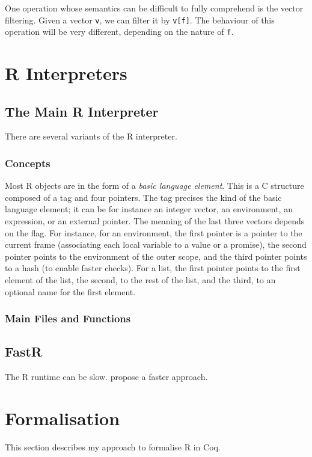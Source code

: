 \documentclass{article}
\newcommand\Coq{Coq}
\newcommand\R{R}
\begin{document}
One operation whose semantics can be difficult
to fully comprehend is the vector filtering.
Given a vector \texttt{v},
we can filter it by \texttt{v[f]}.
The behaviour of this operation will be very different,
depending on the nature of \texttt{f}.


\section{\R{} Interpreters}

\subsection{The Main \R{} Interpreter}

There are several variants of the \R{} interpreter.

\subsubsection{Concepts}

Most \R{} objects are in the form of a \emph{basic language element}.
This is a C structure composed of a tag and four pointers.
The tag precises the kind of the basic language element;
it can be for instance an integer vector, an environment, an expression, or an external pointer.
The meaning of the last three vectors depends on the flag.
%
For instance, for an environment, the first pointer is a pointer
to the current frame (associating each local variable to a value or a promise),
the second pointer points to the environment of the outer scope,
and the third pointer points to a hash (to enable faster checks).
%
For a list, the first pointer points to the first element of the list,
the second, to the rest of the list,
and the third, to an optional name for the first element.

\subsubsection{Main Files and Functions}


\subsection{FastR}

The \R{} runtime can be slow.
\cite{kalibera2014fast} propose a faster approach.


\section{Formalisation}

This section describes my approach to formalise \R{} in \Coq{}.

\printbibliography
\end{document}

